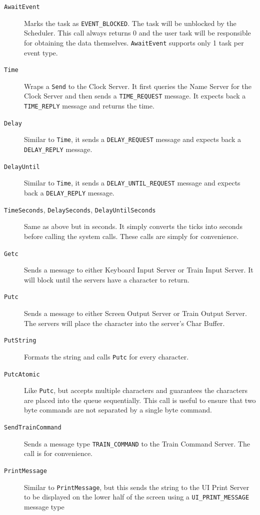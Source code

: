 \documentclass[letterpaper]{article}
\begin{document}
\begin{description}
\item[{\texttt{AwaitEvent}}] \leavevmode 
Marks the task as \texttt{EVENT\_BLOCKED}. The task will be unblocked by the Scheduler. This call always returns 0 and the user task will be responsible for obtaining the data themselves. \texttt{AwaitEvent} supports only 1 task per event type.

\item[{\texttt{Time}}] \leavevmode 
Wraps a \texttt{Send} to the Clock Server. It first queries the Name Server for the Clock Server and then sends a \texttt{TIME\_REQUEST} message. It expects back a \texttt{TIME\_REPLY} message and returns the time.

\item[{\texttt{Delay}}] \leavevmode 
Similar to \texttt{Time}, it sends a \texttt{DELAY\_REQUEST} message and expects back a \texttt{DELAY\_REPLY} message.

\item[{\texttt{DelayUntil}}] \leavevmode 
Similar to \texttt{Time}, it sends a \texttt{DELAY\_UNTIL\_REQUEST} message and expects back a \texttt{DELAY\_REPLY} message.

\item[{\texttt{TimeSeconds}, \texttt{DelaySeconds}, \texttt{DelayUntilSeconds}}] \leavevmode 
Same as above but in seconds. It simply converts the ticks into seconds before calling the system calls. These calls are simply for convenience.

\item[{\texttt{Getc}}] \leavevmode 
Sends a message to either Keyboard Input Server or Train Input Server. It will block until the servers have a character to return.

\item[{\texttt{Putc}}] \leavevmode 
Sends a message to either Screen Output Server or Train Output Server. The servers will place the character into the server's Char Buffer.

\item[{\texttt{PutString}}] \leavevmode 
Formats the string and calls \texttt{Putc} for every character.

\item[{\texttt{PutcAtomic}}] \leavevmode 
Like \texttt{Putc}, but accepts multiple characters and guarantees the characters are placed into the queue sequentially. This call is useful to ensure that two byte commands are not separated by a single byte command.

\item[{\texttt{SendTrainCommand}}] \leavevmode 
Sends a message type \texttt{TRAIN\_COMMAND} to the Train Command Server. The call is for convenience.

\item[{\texttt{PrintMessage}}] \leavevmode 
Similar to \texttt{PrintMessage}, but this sends the string to the UI Print Server to be displayed on the lower half of the screen using a \texttt{UI\_PRINT\_MESSAGE} message type

\end{description}
\end{document}
